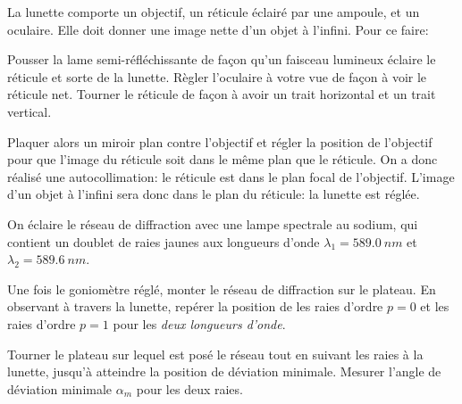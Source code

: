   La lunette comporte un objectif, un réticule éclairé par une ampoule, et un oculaire. Elle doit donner une image nette d'un objet à l'infini. Pour ce faire:
\begin{protocole}
  \item
   Pousser la lame semi-réfléchissante de façon qu'un faisceau lumineux éclaire le réticule et sorte de la lunette. Règler l'oculaire à votre vue de façon à voir le réticule net. Tourner le réticule de façon à avoir un trait horizontal et un trait vertical.
  
  \item Plaquer alors un miroir plan contre l'objectif et régler la position de l'objectif pour que l'image du réticule soit dans le même plan que le réticule. On a donc réalisé une autocollimation: le réticule est dans le plan focal de l'objectif. L'image d'un objet à l'infini sera donc dans le plan du réticule: la lunette est réglée.
\end{protocole}

 On éclaire le réseau de diffraction avec une lampe spectrale au sodium, qui contient un doublet de raies jaunes aux longueurs d’onde $\lambda_1 = \SI{589.0}{nm}$ et $\lambda_2 = \SI{589.6}{nm}$. 
\begin{protocole}
  \item Une fois le goniomètre réglé, monter le réseau de diffraction sur le plateau. En observant à travers la lunette, repérer la position de les raies d’ordre $p=0$ et les raies d’ordre $p=1$ pour les \emph{deux longueurs d’onde}.
  \item Tourner le plateau sur lequel est posé le réseau tout en suivant les raies à la lunette, jusqu’à atteindre la position de déviation minimale. Mesurer l’angle de déviation minimale $\alpha_m$ pour les deux raies.
\end{protocole}
\begin{quest}
\end{quest}

  
